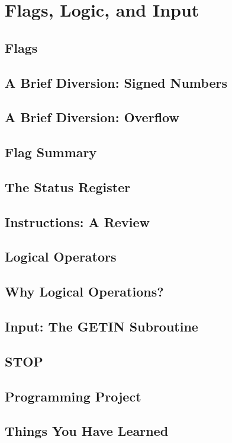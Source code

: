 \documentclass[11pt,a4paper,titlepage]{memoir}
\begin{document}
\chapter{Flags, Logic, and Input}
\blindtext
\newpage
\section{Flags} 
\blindtext
\section{A Brief Diversion: Signed Numbers} 
\blindtext
\section{A Brief Diversion: Overflow} 
\blindtext
\section{Flag Summary} 
\blindtext
\section{The Status Register} 
\blindtext
\section{Instructions: A Review} 
\blindtext
\section{Logical Operators} 
\blindtext
\section{Why Logical Operations?} 
\blindtext
\section{Input: The GETIN Subroutine} 
\blindtext
\section{STOP} 
\blindtext
\section{Programming Project} 
\blindtext
\section{Things You Have Learned} 
\blindtext
\end{document}
